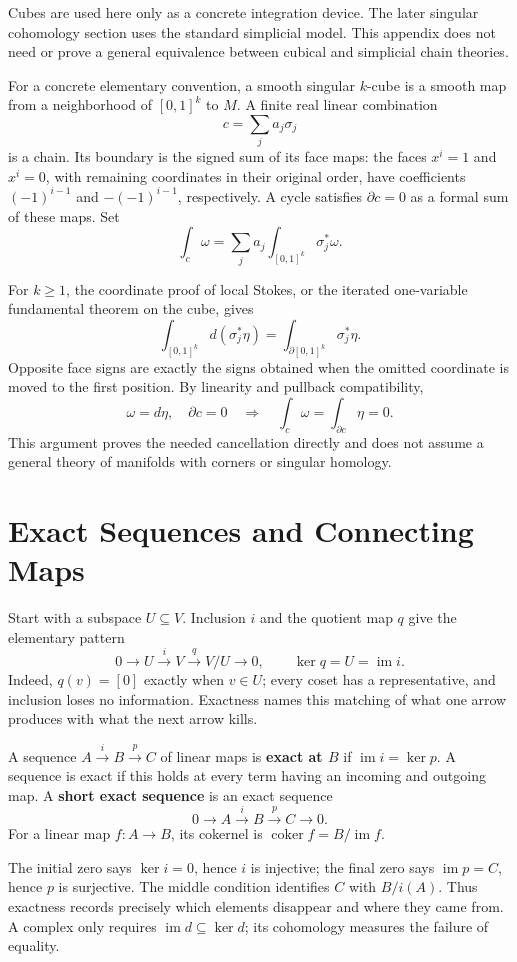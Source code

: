 Cubes are used here only as a concrete integration device. The later
singular cohomology section uses the standard simplicial model. This
appendix does not need or prove a general equivalence between cubical and
simplicial chain theories.

For a concrete elementary convention, a smooth singular $k$-cube is a
smooth map from a neighborhood of $[0,1]^k$ to $M$. A finite real linear
combination
\[
c=\sum_j a_j\sigma_j
\]
 is a chain. Its boundary is the signed
sum of its face maps: the faces $x^i=1$ and $x^i=0$, with remaining
coordinates in their original order, have coefficients $(-1)^{i-1}$ and
$-(-1)^{i-1}$, respectively. A cycle satisfies $\partial c=0$ as a formal
sum of these maps. Set
\[
\int_c\omega=\sum_j a_j\int_{[0,1]^k}\sigma_j^*\omega.
\]

For $k\geq1$, the coordinate proof of local Stokes, or the iterated
one-variable fundamental theorem on the cube, gives
\[
\int_{[0,1]^k}d(\sigma_j^*\eta)
=\int_{\partial[0,1]^k}\sigma_j^*\eta.
\]
Opposite face signs are exactly the signs obtained when the omitted
coordinate is moved to the first position. By linearity and pullback
compatibility,
\[
\boxed{\omega=d\eta,\quad\partial c=0
\quad\Longrightarrow\quad\int_c\omega=\int_{\partial c}\eta=0.}
\]
This argument proves the needed cancellation directly and does not assume
a general theory of manifolds with corners or singular homology.

\section{Exact Sequences and Connecting Maps}
\label{sec:exact-sequences}
Start with a subspace $U\subseteq V$. Inclusion $i$ and the quotient
map $q$ give the elementary pattern
\[
0\longrightarrow U\xrightarrow{i}V\xrightarrow{q}V/U\longrightarrow0,
\qquad \ker q=U=\operatorname{im}i.
\]
Indeed, $q(v)=[0]$ exactly when $v\in U$; every coset has a representative,
and inclusion loses no information. Exactness names this matching of what
one arrow produces with what the next arrow kills.

\begin{definition}[Exactness]\label{def:exact-sequence}
A sequence $A\xrightarrow{i}B\xrightarrow{p}C$ of linear maps is
\textbf{exact at $B$} if $\operatorname{im}i=\ker p$. A sequence is
exact if this holds at every term having an incoming and outgoing map.
A \textbf{short exact sequence} is an exact sequence
\[
0\longrightarrow A\xrightarrow{i}B\xrightarrow{p}C\longrightarrow0.
\]
For a linear map $f:A\to B$, its cokernel is
$\operatorname{coker}f=B/\operatorname{im}f$.
\end{definition}
The initial zero says $\ker i=0$, hence $i$ is injective; the final zero
says $\operatorname{im}p=C$, hence $p$ is surjective. The middle condition
identifies $C$ with $B/i(A)$. Thus exactness records precisely which
elements disappear and where they came from. A complex only requires
$\operatorname{im}d\subseteq\ker d$; its cohomology measures the failure
of equality.

